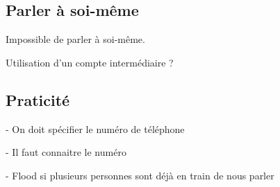 \subsection{Parler à soi-même}

Impossible de parler à soi-même.

Utilisation d'un compte intermédiaire ?
\\




\subsection{Praticité}

- On doit spécifier le numéro de téléphone

- Il faut connaitre le numéro

- Flood si plusieurs personnes sont déjà en train de nous parler
\\
